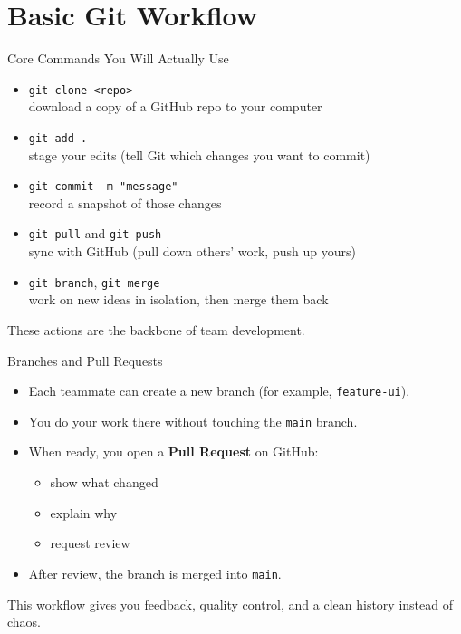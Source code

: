 \documentclass{beamer}
\begin{document}
\section{Basic Git Workflow}

\begin{frame}{Core Commands You Will Actually Use}
  \begin{itemize}
    \item \texttt{git clone <repo>} \\
      download a copy of a GitHub repo to your computer
    \item \texttt{git add .} \\
      stage your edits (tell Git which changes you want to commit)
    \item \texttt{git commit -m "message"} \\
      record a snapshot of those changes
    \item \texttt{git pull} and \texttt{git push} \\
      sync with GitHub (pull down others' work, push up yours)
    \item \texttt{git branch}, \texttt{git merge} \\
      work on new ideas in isolation, then merge them back
  \end{itemize}

  \vspace{2mm}
  These actions are the backbone of team development.
\end{frame}

\begin{frame}{Branches and Pull Requests}
  \begin{itemize}
    \item Each teammate can create a new branch (for example, \texttt{feature-ui}).
    \item You do your work there without touching the \texttt{main} branch.
    \item When ready, you open a \textbf{Pull Request} on GitHub:
      \begin{itemize}
        \item show what changed
        \item explain why
        \item request review
      \end{itemize}
    \item After review, the branch is merged into \texttt{main}.
  \end{itemize}

  \vspace{2mm}
  This workflow gives you feedback, quality control, and a clean history instead of chaos.
\end{frame}
\end{document}
